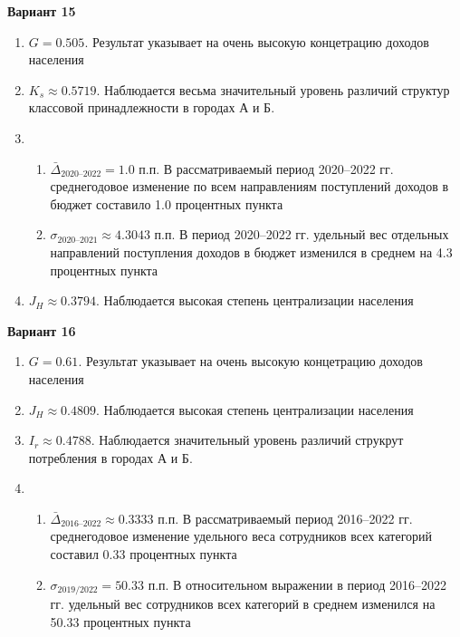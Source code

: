 \documentclass{article}
\begin{document}
\textbf{Вариант 15}
\begin{enumerate}
\item $G= 0.505$. Результат указывает на очень высокую концетрацию доходов населения
\item $K_s\approx 0.5719$. Наблюдается весьма значительный уровень различий структур классовой принадлежности в городах А и Б.
\item \begin{enumerate} \item $\bar\Delta_\text{2020--2022}= 1.0$ п.п. В рассматриваемый период 2020--2022 гг. среднегодовое изменение по всем направлениям поступлений доходов в бюджет составило 1.0 процентных пункта
\item $\sigma_\text{2020--2021}\approx 4.3043$ п.п. В период 2020--2022 гг. удельный вес отдельных направлений поступления доходов в бюджет изменился в среднем на 4.3 процентных пункта\end{enumerate}
\item $J_H \approx 0.3794$. Наблюдается высокая степень централизации населения
\end{enumerate}

\textbf{Вариант 16}
\begin{enumerate}
\item $G= 0.61$. Результат указывает на очень высокую концетрацию доходов населения
\item $J_H \approx 0.4809$. Наблюдается высокая степень централизации населения
\item $I_r\approx 0.4788$. Наблюдается значительный уровень различий струкрут потребления в городах А и Б.
\item \begin{enumerate} \item $\bar\Delta_\text{2016--2022}\approx 0.3333$ п.п. В рассматриваемый период 2016--2022 гг. среднегодовое изменение удельного веса сотрудников всех категорий составил 0.33 процентных пункта
\item $\sigma_\text{2019/2022}= 50.33$ п.п. В относительном выражении в период 2016--2022 гг. удельный вес сотрудников всех категорий в среднем изменился на 50.33 процентных пункта\end{enumerate}
\end{enumerate}
\end{document}
